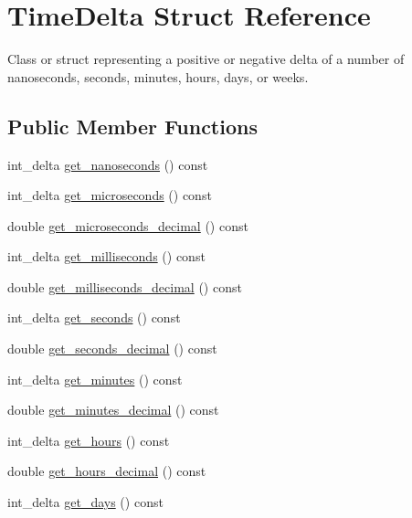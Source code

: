 \hypertarget{structTimeDelta}{\section{\-Time\-Delta \-Struct \-Reference}
\label{structTimeDelta}
}


\-Class or struct representing a positive or negative delta of a number of nanoseconds, seconds, minutes, hours, days, or weeks.  


\subsection*{\-Public \-Member \-Functions}
\begin{DoxyCompactItemize}
\item 
int\-\_\-delta \hyperlink{structTimeDelta_ac5f5521afb1b6118b34bf8987bd3b46f}{get\-\_\-nanoseconds} () const 
\item 
int\-\_\-delta \hyperlink{structTimeDelta_aea0305bf51cadc48b987ff97454201a0}{get\-\_\-microseconds} () const 
\item 
double \hyperlink{structTimeDelta_ad4563212afb3c7e4307a900ceac74995}{get\-\_\-microseconds\-\_\-decimal} () const 
\item 
int\-\_\-delta \hyperlink{structTimeDelta_a3cbd0c925ee1f8f0e028737643a830f6}{get\-\_\-milliseconds} () const 
\item 
double \hyperlink{structTimeDelta_ac7d647ea74d5b3abb8fdcfed1408d139}{get\-\_\-milliseconds\-\_\-decimal} () const 
\item 
int\-\_\-delta \hyperlink{structTimeDelta_a30cec240d3ae960182b5ad473f1f426c}{get\-\_\-seconds} () const 
\item 
double \hyperlink{structTimeDelta_a8d5ce7355977a739fe2330472bf50965}{get\-\_\-seconds\-\_\-decimal} () const 
\item 
int\-\_\-delta \hyperlink{structTimeDelta_a5f96f06d84489a75c4e52c76c682bd43}{get\-\_\-minutes} () const 
\item 
double \hyperlink{structTimeDelta_a9778c70f343b8238c30d72f79832ee68}{get\-\_\-minutes\-\_\-decimal} () const 
\item 
int\-\_\-delta \hyperlink{structTimeDelta_ad2e561054006c1a65a3e610eaf8e6e5e}{get\-\_\-hours} () const 
\item 
double \hyperlink{structTimeDelta_af64fa27b7580167e18cd30ab1bec06ac}{get\-\_\-hours\-\_\-decimal} () const 
\item 
int\-\_\-delta \hyperlink{structTimeDelta_a0ce6b1715ab92fa1e66e14e952a64268}{get\-\_\-days} () const 

\end{DoxyCompactItemize}
